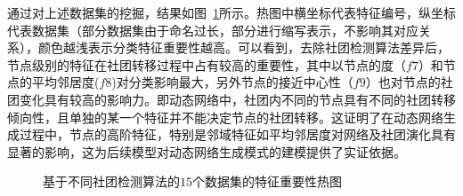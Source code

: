 通过对上述数据集的挖掘，结果如图~\ref{fig.3.3}所示。热图中横坐标代表特征编号，纵坐标代表数据集（部分数据集由于命名过长，部分进行缩写表示，不影响其对应关系），颜色越浅表示分类特征重要性越高。可以看到，去除社团检测算法差异后，节点级别的特征在社团转移过程中占有较高的重要性，其中以节点的度（$f7$）和节点的平均邻居度($f8$)对分类影响最大，另外节点的接近中心性（$f9$）也对节点的社团变化具有较高的影响力。即动态网络中，社团内不同的节点具有不同的社团转移倾向性，且单独的某一个特征并不能决定节点的社团转移。这证明了在动态网络生成过程中，节点的高阶特征，特别是邻域特征如平均邻居度对网络及社团演化具有显著的影响，这为后续模型对动态网络生成模式的建模提供了实证依据。


\begin{figure}[!htbp]
	\caption{基于不同社团检测算法的$15$个数据集的特征重要性热图}
	\label{fig.3.3}
\end{figure}

